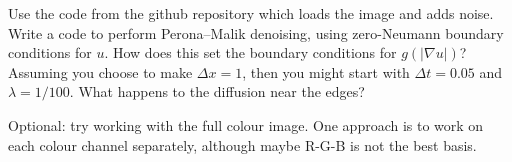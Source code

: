 \documentclass[12pt,a4paper]{article}
\begin{document}
Use the code from the github repository which loads the image and adds
noise.  Write a code to perform Perona--Malik denoising, using zero-Neumann boundary conditions for $u$. How does this set the boundary conditions for $g(|\nabla u|)$? Assuming you choose to make $\Delta x = 1$, then you might start with $\Delta t = 0.05$
and $\lambda = 1/100$. What happens to the diffusion near the edges?

Optional: try working with the full colour image.  One approach is to
work on each colour channel separately, although maybe R-G-B is not
the best basis.




\end{document}
